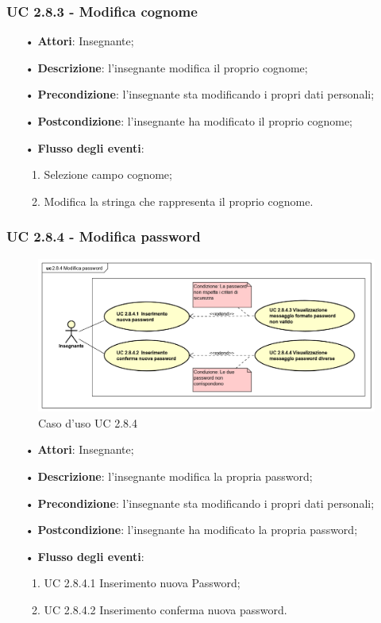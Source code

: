 \subsubsection{UC 2.8.3 - Modifica cognome}
\begin{itemize}
	\item[•]\textbf{Attori}: Insegnante;
	\item[•]\textbf{Descrizione}: l'insegnante modifica il proprio cognome;
	\item[•]\textbf{Precondizione}: l'insegnante sta modificando i propri dati personali;
	\item[•]\textbf{Postcondizione}: l'insegnante ha modificato il proprio cognome; 
	\item[•]\textbf{Flusso degli eventi}: 
	\begin{enumerate}
		\item Selezione campo cognome;
		\item Modifica la stringa che rappresenta il proprio cognome.
	\end{enumerate}
\end{itemize}


\subsubsection{UC 2.8.4 - Modifica password}
\begin{figure}[H]
\centering
\includegraphics[width=17cm]{img/modificapasswordinsegnante.png} 
\caption{Caso d'uso UC 2.8.4}
\end{figure}

\begin{itemize}
	\item[•]\textbf{Attori}: Insegnante;
	\item[•]\textbf{Descrizione}: l'insegnante modifica la propria password;
	\item[•]\textbf{Precondizione}: l'insegnante sta modificando i propri dati personali;
	\item[•]\textbf{Postcondizione}: l'insegnante ha modificato la propria password; 
	\item[•]\textbf{Flusso degli eventi}: 
	\begin{enumerate}
		\item UC 2.8.4.1 Inserimento nuova Password;
		\item UC 2.8.4.2 Inserimento conferma nuova password.
	\end{enumerate}
\end{itemize}


